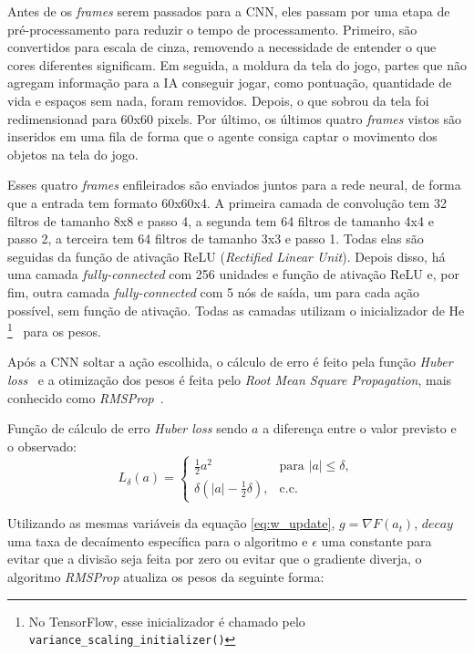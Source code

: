 Antes de os \textit{frames} serem passados para a CNN, eles passam por uma etapa de pré-processamento para reduzir o tempo de processamento.
Primeiro, são convertidos para escala de cinza, removendo a necessidade de entender o que cores diferentes significam.
Em seguida, a moldura da tela do jogo, partes que não agregam informação para a IA conseguir jogar, como pontuação, quantidade de vida e espaços sem nada, foram removidos.
Depois, o que sobrou da tela foi redimensionad para 60x60 pixels.
Por último, os últimos quatro \textit{frames} vistos são inseridos em uma fila de forma que o agente consiga captar o movimento dos objetos na tela do jogo.

Esses quatro \textit{frames} enfileirados são enviados juntos para a rede neural, de forma que a entrada tem formato 60x60x4.
A primeira camada de convolução tem 32 filtros de tamanho 8x8 e passo 4, a segunda tem 64 filtros de tamanho 4x4 e passo 2, a terceira tem 64 filtros de tamanho 3x3 e passo 1.
Todas elas são seguidas da função de ativação ReLU (\textit{Rectified Linear Unit}).
Depois disso, há uma camada \textit{fully-connected} com 256 unidades e função de ativação ReLU e, por fim, outra camada \textit{fully-connected} com 5 nós de saída, um para cada ação possível, sem função de ativação.
Todas as camadas utilizam o inicializador de He \footnote{No TensorFlow, esse inicializador é chamado pelo \texttt{variance\_scaling\_initializer()}}~\cite{DBLP:journals/corr/HeZR015} para os pesos.

Após a CNN soltar a ação escolhida, o cálculo de erro é feito pela função \textit{Huber loss}~\cite{huber_loss} e a otimização dos pesos é feita pelo \textit{Root Mean Square Propagation}, mais conhecido como \textit{RMSProp}~\cite{rmsprop}.

Função de cálculo de erro \textit{Huber loss} sendo $a$ a diferença entre o valor previsto e o observado:
\begin{equation} \label{eq:huber}
L_{\delta}(a) = 
\begin{cases}
\frac{1}{2}a^{2} & \text{para } |a| \leq \delta,\\
\delta(|a| - \frac{1}{2}\delta), & \text{c.c.}
\end{cases}
\end{equation}

Utilizando as mesmas variáveis da equação \ref{eq:w_update}, $g = \nabla F(a_{t})$, $decay$ uma taxa de decaímento específica para o algoritmo e $\epsilon$ uma constante para evitar que a divisão seja feita por zero ou evitar que o gradiente diverja, o algoritmo \textit{RMSProp} atualiza os pesos da seguinte forma:


